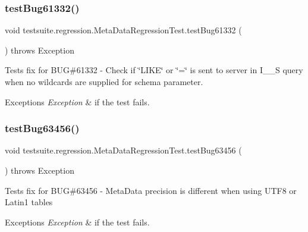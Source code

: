 \subsubsection{\texorpdfstring{test\+Bug61332()}{testBug61332()}}
{\footnotesize\ttfamily void testsuite.\+regression.\+Meta\+Data\+Regression\+Test.\+test\+Bug61332 (\begin{DoxyParamCaption}{ }\end{DoxyParamCaption}) throws Exception}

Tests fix for B\+UG\#61332 -\/ Check if \char`\"{}\+L\+I\+K\+E\char`\"{} or \char`\"{}=\char`\"{} is sent to server in I\+\_\+\+\_\+S query when no wildcards are supplied for schema parameter.


\begin{DoxyExceptions}{Exceptions}
{\em Exception} & if the test fails. \\
\hline
\end{DoxyExceptions}
\mbox{\label{classtestsuite_1_1regression_1_1_meta_data_regression_test_a8d8e4af7ca8136d86aa2ea60237ceb89}} 
\subsubsection{\texorpdfstring{test\+Bug63456()}{testBug63456()}}
{\footnotesize\ttfamily void testsuite.\+regression.\+Meta\+Data\+Regression\+Test.\+test\+Bug63456 (\begin{DoxyParamCaption}{ }\end{DoxyParamCaption}) throws Exception}

Tests fix for B\+UG\#63456 -\/ Meta\+Data precision is different when using U\+T\+F8 or Latin1 tables


\begin{DoxyExceptions}{Exceptions}
{\em Exception} & if the test fails. \\
\hline
\end{DoxyExceptions}
\mbox{\label{classtestsuite_1_1regression_1_1_meta_data_regression_test_af38b67a5bf6e3396cd891b3f8b4d2c8f}} 
